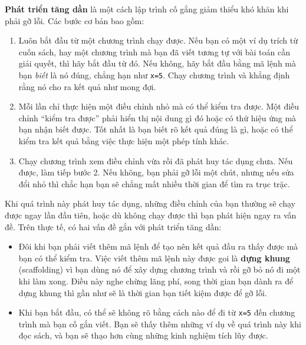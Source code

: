 \documentclass[12pt, openany]{book}
\theoremstyle{exercise}
\begin{document}
{\bf Phát triển tăng dần} là một cách lập trình cố gắng giảm thiểu khó khăn khi phải gỡ lỗi. Các bước cơ bản bao gồm:

\begin{enumerate}

\item Luôn bắt đầu từ một chương trình chạy được. Nếu bạn có một ví dụ trích từ cuốn sách, hay một chương trình mà bạn đã viết tương tự với bài toán cần giải quyết, thì hãy bắt đầu từ đó. Nếu không, hãy bắt đầu bằng mã lệnh mà bạn {\em biết} là nó đúng, chẳng hạn như {\tt x=5}.  Chạy chương trình và khẳng định rằng nó cho ra kết quả như mong đợi.

\item Mỗi lần chỉ thực hiện một điều chỉnh nhỏ mà có thể kiểm tra được. Một điều chỉnh ``kiểm tra được'' phải hiển thị nội dung gì đó hoặc có thứ hiệu ứng mà bạn nhận biết được. Tốt nhất là bạn biết rõ kết quả đúng là gì, hoặc có thể kiểm tra kết quả bằng việc thực hiện một phép tính khác. 


\item Chạy chương trình xem điều chỉnh vừa rồi đã phát huy tác dụng chưa. Nếu được, làm tiếp bước 2. Nếu không, bạn phải gỡ lỗi một chút, nhưng nếu sửa đổi nhỏ thì chắc hạn bạn sẽ chẳng mất nhiều thời gian để tìm ra trục trặc. 

\end{enumerate}

Khi quá trình này phát huy tác dụng, những điều chỉnh của bạn thường sẽ chạy được ngay lần đầu tiên, hoặc dù không chạy được thì bạn phát hiện ngay ra vấn đề. Trên thực tế, có hai vấn đề gắn với phát triển tăng dần:

\begin{itemize}

\item Đôi khi bạn phải viết thêm mã lệnh để tạo nên kết quả đầu ra thấy được mà bạn có thể kiểm tra. Việc viết thêm mã lệnh này được goi là {\bf dựng khung} (scaffolding) vì bạn dùng nó để xây dựng chương trình và rồi gỡ bỏ nó đi một khi làm xong. Điều này nghe chừng lãng phí, song thời gian bạn dành ra để dựng khung thì gần như sẽ là thời gian bạn tiết kiệm được để gỡ lỗi.


\item Khi bạn bắt đầu, có thể sẽ không rõ bằng cách nào để đi từ {\tt x=5} đến chương trình mà bạn cố gắn viết. Bạn sẽ thấy thêm những ví dụ về quá trình này khi đọc sách, và bạn sẽ thạo hơn cùng những kinh nghiệm tích lũy được.

\end{itemize}
\end{document}

